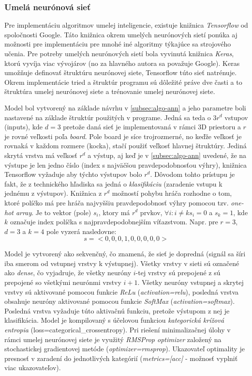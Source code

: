 \subsubsection{Umelá neurónová sieť}

Pre implementáciu algoritmov umelej inteligencie, existuje knižnica \emph{Tensorflow}\cite{tensorflow} od spoločnosti
Google.
Táto knižnica okrem umelých neurónových sietí ponúka aj možnosti pre implementáciu pre mnohé iné algoritmy týkajúce sa
strojového učenia.
Pre potreby umelých neurónových sietí bola vyvinutá knižnica \emph{Keras}\cite{keras}, ktorú vyvíja viac vývojárov
(no za hlavného autora sa považuje Google).
Keras umožňuje definovať štruktúru neurónovej siete, Tensorflow túto sieť natrénuje.
Okrem implementácie tried a štruktúr programu sú dôležité práve dve časti a to štruktúra umelej neurónovej siete a
trénovanie umelej neurónovej siete.

Model bol vytvorený na základe návrhu v \autoref{subsec:algo-ann} a jeho parametre boli nastavené na základe
štruktúr použitých v programe.
Jedná sa teda o $3r^d$ vstupov (inputs), kde $d=3$ pretože daná sieť je implementovaná v rámci 3D priestoru a $r$ je
rovné veľkosti poľa \emph{board}.
Pole board je síce trojrozmerné, no keďže veľkosť je rovnaká v každom rozmere (kocka), stačí použiť veľkosť hlavnej
štruktúry.
Jediná skrytá vrstva má veľkosť $r^d$ a výstup, aj keď je v \autoref{subsec:algo-ann} uvedené, že na výstupe je len
jedno číslo (index s najväčšou pravdepodobnosťou výhry), knižnica Tensorflow vyžaduje aby týchto výstupov bolo $r^d$.
Dôvodom tohto prístupu je fakt, že z technického hľadiska sa jedná o \emph{klasifikáciu} (zaradenie vstupu k jednému z
výstupov).
Knižnica z $r^d$ možností pohybu hráča rozhodne o tom, ktoré políčko má pre hráča najvyššiu pravdepodobnosť výhry
pomocou tzv. \emph{one-hot array}.
Je to vektor (pole) $s_i$, ktory má $r^d$ prvkov, $\forall i : i\neq k s_i=0$ a $s_k=1$, kde $k$ označuje index
políčka s najpravdepodobnejším víťazstvom.
Napr. pre $r=3$, $d=3$ a $k=4$ pole vyzerá nasledovne:
\begin{equation}
    s = <0, 0, 0, 1, 0, 0, 0, 0, 0>
\end{equation}

Model je vytvorený ako sekvenčný, čo znamená, že sieť je dopredná (signál sa šíri iba smerom od vstupnej vrstvy k
výstupnej).
Všetky vrstvy v sieti sú označené ako \emph{dense}, čo vyjadruje, že všetky neuróny $i$-tej vrstvy sú prepojené z sú
prepojené so všetkými neurónmi vrstvy $i+1$.
Všetky neuróny vstupnej a skrytej vrstvy sú aktivované pomocou funkcie \emph{ReLu} (\emph{activation=relu}), posledná
vrstva obsahuje neuróny aktivované pomocou funkcie \emph{SoftMax} (\emph{activation=softmax}).
Posledná vrstva vyžaduje túto aktivačnú funkciu, pretože výstupom z nej je klasifikácia.
Model je kompilovaný s účelovou funkciou \emph{kategorická krížová entropia} (loss=categorical\_crossentropy).
Pri riešení minimalizačnej úlohy v rámci umelej neurónovej siete je využitý \emph{RMSProp optimizer} založený na
stochastickej gradientovej metóde (\emph{optimizer=rmsprop}).
Ukazovateľ optimality je presnosť v zaradení do jednotlivých kategórií (\emph{metrics=[acc]} - možnosť vyplniť viac
ukazovateľov).

